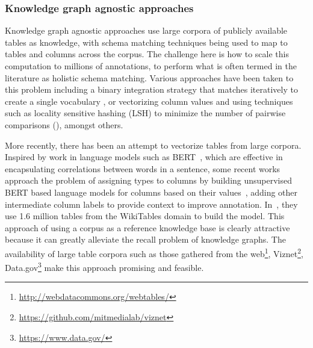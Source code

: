 \documentclass[sigconf, nonacm]{acmart}
\begin{document}
\subsubsection{Knowledge graph agnostic approaches}
Knowledge graph agnostic approaches use large corpora of publicly available tables as knowledge, with schema matching techniques being used to map to tables and columns across the corpus.  The challenge here is how to scale this computation to millions of annotations, to perform what is often termed in the literature as holistic schema matching. Various approaches have been taken to this problem including a binary integration strategy that matches iteratively to create a single vocabulary \cite{10.1145/27633.27634}, or vectorizing column values and using techniques such as locality sensitive hashing (LSH) to minimize the number of pairwise comparisons (\cite{10.1007/978-3-642-35176-1_4}), amongst others.  

More recently, there has been an attempt to vectorize tables from large corpora.  Inspired by work in language models such as BERT~\cite{bert}, which are effective in encapsulating correlations between words in a sentence, some recent works approach the problem of assigning types to columns by building unsupervised BERT based language models for columns based on their values~\cite{trabelsi2020semantic}, adding other intermediate column labels to provide context to improve annotation.  In~\cite{trabelsi2020semantic}, they use 1.6 million tables from the WikiTables domain to build the model.  This approach of using a corpus as a reference knowledge base is clearly attractive because it can greatly alleviate the recall problem of knowledge graphs. The availability of large table corpora such as those gathered from the web\footnote{\url{http://webdatacommons.org/webtables/}}, Viznet\footnote{\url{https://github.com/mitmedialab/viznet}}, Data.gov\footnote{\url{https://www.data.gov/}} make this approach promising and feasible.

\end{document}

